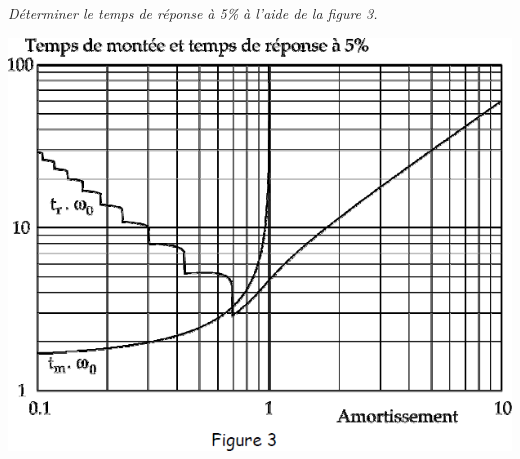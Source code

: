 \documentclass[11pt,oneside]{article}
\begin{document}
\subparagraph{}
\textit{Déterminer le temps de réponse à 5\% à l'aide de la figure 3.}


\begin{center}
\includegraphics[width=.7\textwidth]{png/image5}
\end{center}



%
%
%
%
%
%
%
%
%
\end{document}
